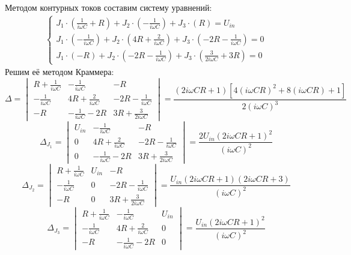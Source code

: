  Методом контурных токов составим систему уравнений:
\begin{gather}
	\left\{
	\begin{aligned}
		J_1\cdot\left(\frac{1}{i\omega C}+R\right)+J_2\cdot\left( -\frac{1}{i\omega C} \right)+J_3\cdot\left(R \right)=U_{in}\\
		J_1\cdot\left(-\frac{1}{i\omega C}\right)+J_2\cdot\left(4R+\frac{2}{i\omega C} \right)+J_3\cdot\left(-2R-\frac{1}{i\omega C} \right)=0\\
		J_1\cdot\left(-R\right)+J_2\cdot\left( -2R-\frac{1}{i\omega C} \right)+J_3\cdot\left(\frac{3}{2i\omega C}+3R \right)=0
	\end{aligned}
	\right.
\end{gather}
Решим её методом Краммера:
\begin{equation}
	\Delta =\begin{vmatrix} 
		R+\frac{1}{i\omega C} & -\frac{1}{i\omega C} & -R\\
		-\frac{1}{i\omega C} & 4R+\frac{2}{i\omega C} & -2R-\frac{1}{i\omega C}\\
		-R & -\frac{1}{i\omega C}-2R & 3R+\frac{3}{2i\omega C}\
	\end{vmatrix}=
\frac{(2i\omega CR+1)[4(i\omega CR)^2+8(i\omega CR)+1]}{2(i\omega C)^3}
\end{equation}
\begin{equation}
	\Delta_{J_1} =\begin{vmatrix} 
		U_{in} & -\frac{1}{i\omega C} & -R\\
		0 & 4R+\frac{2}{i\omega C} & -2R-\frac{1}{i\omega C}\\
		0 & -\frac{1}{i\omega C}-2R & 3R+\frac{3}{2i\omega C}\
	\end{vmatrix}=
\frac{2U_{in}(2i\omega CR+1)^2}{(i\omega C)^2}	
\end{equation}
\begin{equation}
	\Delta_{J_2} =\begin{vmatrix} 
		R+\frac{1}{i\omega C} & U_{in} & -R\\
		-\frac{1}{i\omega C} & 0 & -2R-\frac{1}{i\omega C}\\
		-R & 0 & 3R+\frac{3}{2i\omega C}\
	\end{vmatrix}=
		\frac{U_{in}(2i\omega CR+1)(2i\omega CR+3)}{(i\omega C)^2}	
\end{equation}
\begin{equation}
	\Delta_{J_3} =\begin{vmatrix} 
		R+\frac{1}{i\omega C} & -\frac{1}{i\omega C} & U_{in}\\
		-\frac{1}{i\omega C} & 4R+\frac{2}{i\omega C} & 0\\
		-R & -\frac{1}{i\omega C}-2R & 0\
	\end{vmatrix}=
	\frac{U_{in}(2i\omega CR+1)^2}{(i\omega C)^2}	
\end{equation}
